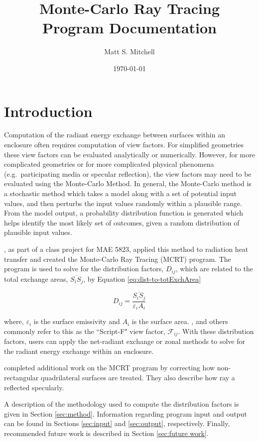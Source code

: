 \documentclass{article}
\title{\textbf{Monte-Carlo Ray Tracing} \\ Program Documentation}
\date{\today}
\author{Matt S. Mitchell}
\begin{document}
\maketitle
\clearpage
\tableofcontents
\clearpage

\section{Introduction}

Computation of the radiant energy exchange between surfaces within an enclosure often requires computation of view factors. For simplified geometries these view factors can be evaluated analytically or numerically. However, for more complicated geometries or for more complicated physical phenomena (e.g.~participating media or specular reflection), the view factors may need to be evaluated using the Monte-Carlo Method. In general, the Monte-Carlo method is a stochastic method which takes a model along with a set of potential input values, and then perturbs the input values randomly within a plausible range. From the model output, a probability distribution function is generated which helps identify the most likely set of outcomes, given a random distribution of plausible input values.

\cite{Nigusse2004}, as part of a class project for MAE 5823, applied this method to radiation heat transfer and created the Monte-Carlo Ray Tracing (MCRT) program. The program is used to solve for the distribution factors, $D_{ij}$, which are related to the total exchange areas, $\overline{S_i S_j}$, by Equation \ref{eq:dist-to-totExchArea}

\begin{equation}
    D_{ij} = \frac{\overline{S_i S_j}}{\varepsilon_i A_i}
    \label{eq:dist-to-totExchArea}
\end{equation}

where, $\varepsilon_i$ is the surface emissivity and $A_i$ is the surface area. \cite{Modest2003}, and others commonly refer to this as the ``Script-F" view factor, $\mathscr{F}_{ij}$. With these distribution factors, users can apply the net-radiant exchange or zonal methods to solve for the radiant energy exchange within an enclosure. 

\citep{HolmanSpitlerSikha2012} completed additional work on the MCRT program by correcting how non-rectangular quadrilateral surfaces are treated. They also describe how ray a reflected specularly.

A description of the methodology used to compute the distribution factors is given in Section \ref{sec:method}. Information regarding program input and output can be found in Sections \ref{sec:input} and \ref{sec:output}, respectively. Finally, recommended future work is described in Section \ref{sec:future work}.
\end{document}
